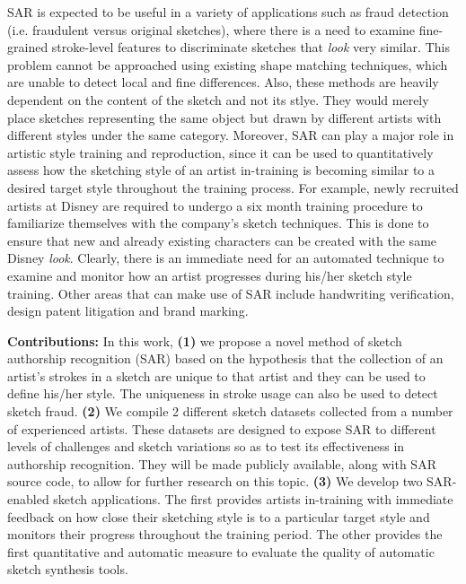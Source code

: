 \vspace{-1mm}
SAR is expected to be useful in a variety of applications such as fraud detection (i.e. fraudulent versus original sketches), where there is a need to examine fine-grained stroke-level features to discriminate sketches that \emph{look} very similar. This problem cannot be approached using existing shape matching techniques, which are unable to detect local and fine differences. Also, these methods are heavily dependent on the content of the sketch and not its stlye. They would merely place sketches representing the same object but drawn by different artists with different styles under the same category. Moreover, SAR can play a major role in artistic style training and reproduction, since it can be used to quantitatively assess how the sketching style of an artist in-training is becoming similar to a desired target style throughout the training process. For example, newly recruited artists at Disney
are required to undergo a six month training procedure to familiarize themselves with the company's sketch techniques. This is done to ensure that new and already existing characters can be created with the same Disney \emph{look}. Clearly, there is an immediate need for an automated technique to examine and monitor how an artist progresses during his/her sketch style training. Other areas that can make use of SAR include handwriting verification, design patent litigation and brand marking.

\vspace{-1mm}
\textbf{Contributions:} In this work, \textbf{(1)} we propose a novel method of sketch authorship recognition (SAR) based on the hypothesis that the collection of an artist's strokes in a sketch are unique to that artist and they can be used to define his/her style. The uniqueness in stroke usage can also be used to detect sketch fraud. \textbf{(2)} We compile 2 different sketch datasets collected from  a number of experienced artists. These datasets are designed to expose SAR to different levels of challenges and sketch variations so as to test its effectiveness in authorship recognition. They will be made publicly available, along with SAR source code, to allow for further research on this topic. \textbf{(3)} We develop two SAR-enabled sketch applications. The first provides artists in-training with immediate feedback on how close their sketching style is to a particular target style and monitors their progress throughout the training period. The other provides the first quantitative and automatic measure to evaluate the quality of automatic sketch synthesis tools.

